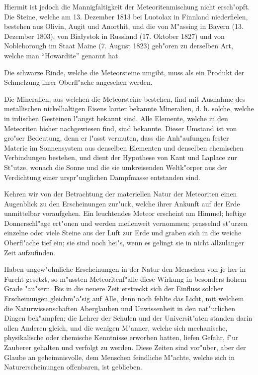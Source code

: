 \documentclass[a4paper, 11pt, oneside, german]{article}
\begin{document}
Hiermit ist jedoch die Mannigfaltigkeit der Meteoritenmischung nicht ersch"opft. Die Steine, welche am 13. Dezember 1813 bei Luotolax in Finnland niederfielen, bestehen aus Olivin, Augit und Anorthit, und die von M"assing in Bayern (13. Dezember 1803), von Białystok in Russland (17. Oktober 1827) und von Nobleborough im Staat Maine (7. August 1823) geh"oren zu derselben Art, welche man "`Howardite"' genannt hat.

Die schwarze Rinde, welche die Meteorsteine umgibt, muss als ein Produkt der Schmelzung ihrer Oberfl"ache angesehen werden.

Die Mineralien, aus welchen die Meteorsteine bestehen, find mit Ausnahme des metallischen nickelhaltigen Eisens lauter bekannte Mineralien, d. h. solche, welche in irdischen Gesteinen l"angst bekannt sind. Alle Elemente, welche in den Meteoriten bisher nachgewiesen find, sind bekannte. Dieser Umstand ist von gro"ser Bedeutung, denn er l"asst vermuten, dass die Anh"aufungen fester Materie im Sonnensystem aus denselben Elementen und denselben chemischen Verbindungen bestehen, und dient der Hypothese von Kant und Laplace zur St"utze, wonach die Sonne und die sie umkreisenden Weltk"orper aus der Verdichtung einer urspr"unglichen Dampfmasse entstanden sind.

Kehren wir von der Betrachtung der materiellen Natur der Meteoriten einen Augenblick zu den Erscheinungen zur"uck, welche ihrer Ankunft auf der Erde unmittelbar voraufgehen. Ein leuchtendes Meteor erscheint am Himmel; heftige Donnerschl"age ert"onen und werden meilenweit vernommen; prasselnd st"urzen einzelne oder viele Steine aus der Luft zur Erde und graben sich in die weiche Oberfl"ache tief ein; sie sind noch hei"s, wenn es gelingt sie in nicht allzulanger Zeit aufzufinden.

Haben ungew"ohnliche Erscheinungen in der Natur den Menschen von je her in Furcht gesetzt, so m"ussten Meteoritenf"alle diese Wirkung in besonders hohem Grade "au"sern. Bis in die neuere Zeit erstreckt sich der Einfluss solcher Erscheinungen gleichm"a"sig auf Alle, denn noch fehlte das Licht, mit welchem die Naturwissenschaften Aberglauben und Unwissenheit in den nat"urlichen Dingen bek"ampfen; die Lehrer der Schulen und der Universit"aten standen darin allen Anderen gleich, und die wenigen M"anner, welche sich mechanische, physikalische oder chemische Kenntnisse erworben hatten, liefen Gefahr, f"ur Zauberer gehalten und verfolgt zu werden. Diese Zeiten sind vor"uber, aber der Glaube an geheimnisvolle, dem Menschen feindliche M"achte, welche sich in Naturerscheinungen offenbaren, ist geblieben.
\end{document}
